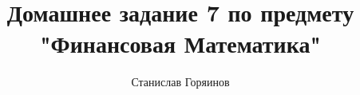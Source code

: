 

\date{}
\title{Домашнее задание 7 по предмету "Финансовая Математика"}
\author{Станислав Горяинов}


\maketitle




